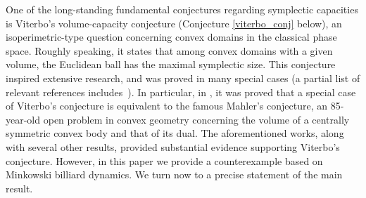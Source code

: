 \documentclass[10pt,a4paper]{article}
\theoremstyle{definition}
\begin{document}
One of the long-standing fundamental conjectures regarding symplectic capacities is  
Viterbo's volume-capacity conjecture \cite{viterbo2000} (Conjecture \ref{viterbo_conj} below), an isoperimetric-type question concerning convex domains in the classical phase space. Roughly speaking, it  states that among convex domains with a given volume, the Euclidean ball has the maximal symplectic size. This conjecture inspired extensive research, and was proved in many special cases 
(a partial list of relevant references includes~\cite{abbondandoloBenedetti,  abbondandolo-benedetti-edtmair,abhs, ArtsteinAvidanOstroverMilman, balitsky,Ch-H,edtmair, gutt-hutchings-ramos,hermann, karasev-sharipova, rudolf}). 
In particular, in \cite{capacity_mahler}, it was proved that a special case of Viterbo's conjecture is equivalent to the famous Mahler's conjecture, an 85-year-old open problem in convex geometry concerning the volume of a centrally symmetric convex body and that of its dual. 
The aforementioned  works, along with several other results, provided substantial evidence supporting Viterbo's conjecture. 
However, in this paper we provide  a counterexample
based on Minkowski billiard dynamics. We  turn now to a precise statement of the main result.

\medskip 
\end{document}
